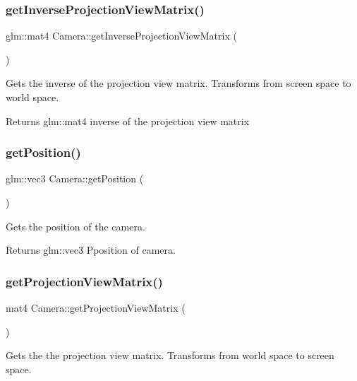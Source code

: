 \subsubsection{\texorpdfstring{getInverseProjectionViewMatrix()}{getInverseProjectionViewMatrix()}}
{\footnotesize\ttfamily glm\+::mat4 Camera\+::get\+Inverse\+Projection\+View\+Matrix (\begin{DoxyParamCaption}{ }\end{DoxyParamCaption})}

Gets the inverse of the projection view matrix. Transforms from screen space to world space.

\begin{DoxyReturn}{Returns}
glm\+::mat4 inverse of the projection view matrix 
\end{DoxyReturn}
\mbox{\label{class_camera_a520c5a7413b3e704f2f442288db17bcf}} 
\subsubsection{\texorpdfstring{getPosition()}{getPosition()}}
{\footnotesize\ttfamily glm\+::vec3 Camera\+::get\+Position (\begin{DoxyParamCaption}{ }\end{DoxyParamCaption})}

Gets the position of the camera.

\begin{DoxyReturn}{Returns}
glm\+::vec3 Pposition of camera. 
\end{DoxyReturn}
\mbox{\label{class_camera_a6e72edaca7d7d8936b29071789a26bd8}} 
\subsubsection{\texorpdfstring{getProjectionViewMatrix()}{getProjectionViewMatrix()}}
{\footnotesize\ttfamily mat4 Camera\+::get\+Projection\+View\+Matrix (\begin{DoxyParamCaption}{ }\end{DoxyParamCaption})}

Gets the the projection view matrix. Transforms from world space to screen space.

